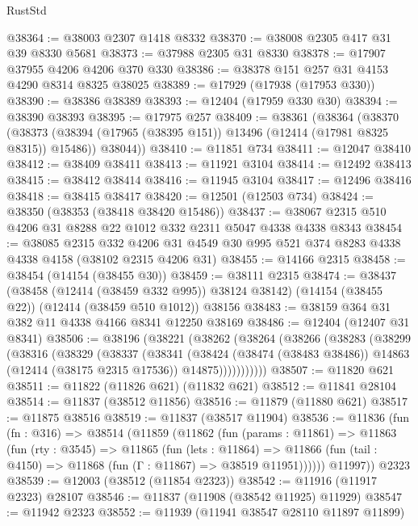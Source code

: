 \begin{lexlean}{RustStd}
\begin{coremodule}
@38364 := @38003 @2307 @1418 @8332
@38370 := @38008 @2305 @417 @31 @39 @8330 @5681
@38373 := @37988 @2305 @31 @8330
@38378 := @17907 @37955 @4206 @4206 @370 @330
@38386 := @38378 @151 @257 @31 @4153 @4290 @8314 @8325 @38025
@38389 := @17929 (@17938 (@17953 @330))
@38390 := @38386 @38389
@38393 := @12404 (@17959 @330 @30)
@38394 := @38390 @38393
@38395 := @17975 @257
@38409 := @38361
    (@38364
      (@38370
        (@38373 (@38394 (@17965 (@38395 @151)) @13496 (@12414 (@17981 @8325 @8315)) @15486))
        @38044))
@38410 := @11851 @734
@38411 := @12047 @38410
@38412 := @38409 @38411
@38413 := @11921 @3104
@38414 := @12492 @38413
@38415 := @38412 @38414
@38416 := @11945 @3104
@38417 := @12496 @38416
@38418 := @38415 @38417
@38420 := @12501 (@12503 @734)
@38424 := @38350 (@38353 (@38418 @38420 @15486))
@38437 := @38067 @2315 @510 @4206 @31 @8288 @22 @1012 @332 @2311 @5047 @4338 @4338 @8343
@38454 := @38085
    @2315
    @332
    @4206
    @31
    @4549
    @30
    @995
    @521
    @374
    @8283
    @4338
    @4338
    @4158
    (@38102 @2315 @4206 @31)
@38455 := @14166 @2315
@38458 := @38454 (@14154 (@38455 @30))
@38459 := @38111 @2315
@38474 := @38437
    (@38458 (@12414 (@38459 @332 @995)) @38124 @38142)
    (@14154 (@38455 @22))
    (@12414 (@38459 @510 @1012))
    @38156
@38483 := @38159 @364 @31 @382 @11 @4338 @4166 @8341 @12250 @38169
@38486 := @12404 (@12407 @31 @8341)
@38506 := @38196
    (@38221
      (@38262
        (@38264
          (@38266
            (@38283
              (@38299
                (@38316
                  (@38329
                    (@38337
                      (@38341
                        (@38424
                          (@38474 (@38483 @38486))
                          @14863
                          (@12414 (@38175 @2315 @17536))
                          @14875)))))))))))
@38507 := @11820 @621
@38511 := @11822 (@11826 @621) (@11832 @621)
@38512 := @11841 @28104
@38514 := @11837 (@38512 @11856)
@38516 := @11879 (@11880 @621)
@38517 := @11875 @38516
@38519 := @11837 (@38517 @11904)
@38536 := @11836
    (fun (fn : @316) =>
    @38514
      (@11859
        (@11862
          (fun (params : @11861) =>
          @11863
            (fun (rty : @3545) =>
            @11865
              (fun (lets : @11864) =>
              @11866 (fun (tail : @4150) => @11868 (fun (Γ : @11867) => @38519 @11951))))))
        @11997))
    @2323
@38539 := @12003 (@38512 (@11854 @2323))
@38542 := @11916 (@11917 @2323) @28107
@38546 := @11837 (@11908 (@38542 @11925) @11929)
@38547 := @11942 @2323
@38552 := @11939 (@11941 @38547 @28110 @11897 @11899)

\end{coremodule}
\end{lexlean}
